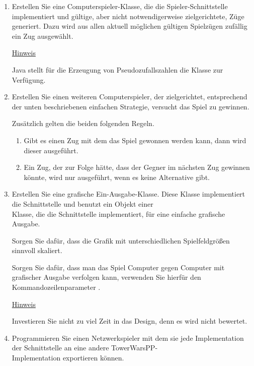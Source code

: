 \begin{enumerate}
\item Erstellen Sie eine Computerspieler-Klasse, die die Spieler-Schnittstelle implementiert und gültige, aber nicht notwendigerweise zielgerichtete, Züge generiert. Dazu wird aus allen aktuell möglichen gültigen Spielzügen zufällig ein Zug ausgewählt.

\underline{Hinweis}

Java stellt für die Erzeugung von Pseudozufallszahlen die Klasse  zur Verfügung.

\item Erstellen Sie einen weiteren Computerspieler, der zielgerichtet, entsprechend der unten beschriebenen einfachen Strategie, versucht das Spiel zu gewinnen.

Zusätzlich gelten die beiden folgenden Regeln.
\begin{enumerate}[label=\alph*)]
\item Gibt es einen Zug mit dem das Spiel gewonnen werden kann, dann wird dieser ausgeführt.
\item Ein Zug, der zur Folge hätte, dass der Gegner im nächsten Zug gewinnen könnte, wird nur ausgeführt, wenn es keine Alternative gibt.
\end{enumerate}

\item Erstellen Sie eine grafische Ein-Ausgabe-Klasse. Diese Klasse implementiert die Schnittstelle  und benutzt ein Objekt einer \\Klasse, die die Schnittstelle  implementiert, für eine einfache grafische Ausgabe.

Sorgen Sie dafür, dass die Grafik mit unterschiedlichen Spielfeldgrößen sinnvoll skaliert.

Sorgen Sie dafür, dass man das Spiel Computer gegen Computer mit grafischer Ausgabe verfolgen kann, verwenden Sie hierfür den Kommandozeilenparameter .

\underline{Hinweis}

Investieren Sie nicht zu viel Zeit in das Design, denn es wird nicht bewertet.

\item Programmieren Sie einen Netzwerkspieler mit dem sie jede Implementation der Schnittstelle  an eine andere TowerWarsPP- \\Implementation exportieren können.


\end{enumerate}
